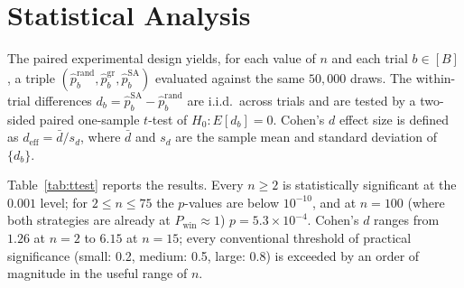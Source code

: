 
\section{Statistical Analysis}
\label{sec:stats}

The paired experimental design yields, for each value of $n$ and each trial
$b \in [B]$, a triple $(\hat{p}^{\mathrm{rand}}_b, \hat{p}^{\mathrm{gr}}_b,
\hat{p}^{\mathrm{SA}}_b)$ evaluated against the same $50{,}000$ draws.
The within-trial differences $d_b = \hat{p}^{\mathrm{SA}}_b -
\hat{p}^{\mathrm{rand}}_b$ are i.i.d.\ across trials and are tested by a
two-sided paired one-sample $t$-test of $H_0: E[d_b] = 0$.
Cohen's $d$ effect size \cite{Cohen1988} is defined as
$d_{\mathrm{eff}} = \bar{d}/s_d$, where $\bar{d}$ and $s_d$ are the
sample mean and standard deviation of $\{d_b\}$.

Table~\ref{tab:ttest} reports the results.  Every $n \ge 2$ is
statistically significant at the $0.001$ level; for $2 \le n \le 75$ the
$p$-values are below $10^{-10}$, and at $n = 100$ (where both strategies
are already at $P_{\mathrm{win}} \approx 1$) $p = 5.3 \times 10^{-4}$.
Cohen's $d$ ranges from $1.26$ at $n=2$ to $6.15$ at $n=15$; every
conventional threshold of practical significance (small: 0.2, medium: 0.5,
large: 0.8) is exceeded by an order of magnitude in the useful range of
$n$.

